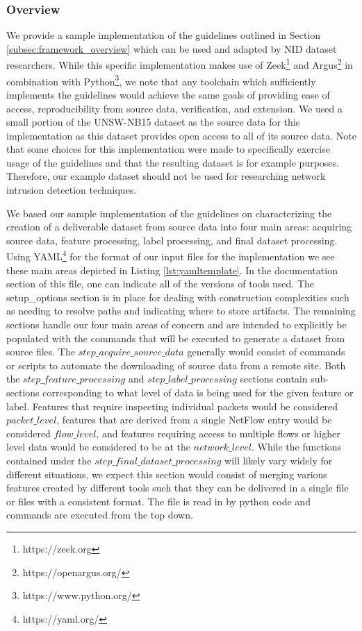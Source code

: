 \documentclass[conference]{IEEEtran}
\begin{document}
\subsubsection{Overview}\label{subsubsec:sample_overview}
We provide a sample implementation of the guidelines outlined in Section \ref{subsec:framework_overview} which can be used and adapted by NID dataset researchers.
While this specific implementation makes use of Zeek\footnote{https://zeek.org} and Argus\footnote{https://openargus.org/} in combination with Python\footnote{https://www.python.org/}, we note that any toolchain which sufficiently implements the guidelines would achieve the same goals of providing ease of access, reproducibility from source data, verification, and extension.
We used a small portion of the UNSW-NB15 dataset \cite{unswnb15} as the source data for this implementation as this dataset provides open access to all of its source data.
Note that some choices for this implementation were made to specifically exercise usage of the guidelines and that the resulting dataset is for example purposes.
Therefore, our example dataset should not be used for researching network intrusion detection techniques.

We based our sample implementation of the guidelines on characterizing the creation of a deliverable dataset from source data into four main areas:  acquiring source data, feature processing, label processing, and final dataset processing.
Using YAML\footnote{https://yaml.org/} for the format of our input files for the implementation we see these main areas depicted in Listing \ref{lst:yamltemplate}.
In the documentation section of this file, one can indicate all of the versions of tools used.
The setup\_options section is in place for dealing with construction complexities such as needing to resolve paths and indicating where to store artifacts.
The remaining sections handle our four main areas of concern and are intended to explicitly be populated with the commands that will be executed to generate a dataset from source files.
The $step\_acquire\_source\_data$ generally would consist of commands or scripts to automate the downloading of source data from a remote site.
Both the $step\_feature\_processing$ and $step\_label\_processing$ sections contain sub-sections corresponding to what level of data is being used for the given feature or label.
Features that require inspecting individual packets would be considered $packet\_level$, features that are derived from a single NetFlow entry would be considered $flow\_level$, and features requiring access to multiple flows or higher level data would be considered to be at the $network\_level$.
While the functions contained under the $step\_final\_dataset\_processing$ will likely vary widely for different situations, we expect this section would consist of merging various features created by different tools such that they can be delivered in a single file or files with a consistent format.
The file is read in by python code and commands are executed from the top down.
\end{document}
